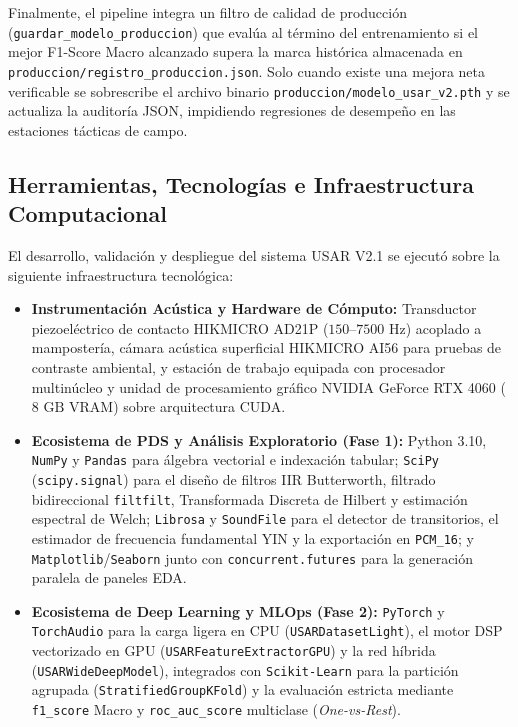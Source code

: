 \documentclass[11pt, a4paper]{article}
\begin{document}
Finalmente, el pipeline integra un filtro de calidad de producción (\texttt{guardar\_modelo\_produccion}) que evalúa al término del entrenamiento si el mejor F1-Score Macro alcanzado supera la marca histórica almacenada en \texttt{produccion/registro\_produccion.json}. Solo cuando existe una mejora neta verificable se sobrescribe el archivo binario \texttt{produccion/modelo\_usar\_v2.pth} y se actualiza la auditoría JSON, impidiendo regresiones de desempeño en las estaciones tácticas de campo.

\subsection{Herramientas, Tecnologías e Infraestructura Computacional}
El desarrollo, validación y despliegue del sistema USAR V2.1 se ejecutó sobre la siguiente infraestructura tecnológica:
\begin{itemize}
    \item \textbf{Instrumentación Acústica y Hardware de Cómputo:} Transductor piezoeléctrico de contacto HIKMICRO AD21P ($150\text{--}7500\text{ Hz}$) acoplado a mampostería, cámara acústica superficial HIKMICRO AI56 para pruebas de contraste ambiental, y estación de trabajo equipada con procesador multinúcleo y unidad de procesamiento gráfico NVIDIA GeForce RTX 4060 ($8\text{ GB}$ VRAM) sobre arquitectura CUDA.
    \item \textbf{Ecosistema de PDS y Análisis Exploratorio (Fase 1):} Python 3.10, \texttt{NumPy} y \texttt{Pandas} para álgebra vectorial e indexación tabular; \texttt{SciPy} (\texttt{scipy.signal}) para el diseño de filtros IIR Butterworth, filtrado bidireccional \texttt{filtfilt}, Transformada Discreta de Hilbert y estimación espectral de Welch; \texttt{Librosa} y \texttt{SoundFile} para el detector de transitorios, el estimador de frecuencia fundamental YIN y la exportación en \texttt{PCM\_16}; y \texttt{Matplotlib}/\texttt{Seaborn} junto con \texttt{concurrent.futures} para la generación paralela de paneles EDA.
    \item \textbf{Ecosistema de Deep Learning y MLOps (Fase 2):} \texttt{PyTorch} y \texttt{TorchAudio} para la carga ligera en CPU (\texttt{USARDatasetLight}), el motor DSP vectorizado en GPU (\texttt{USARFeatureExtractorGPU}) y la red híbrida (\texttt{USARWideDeepModel}), integrados con \texttt{Scikit-Learn} para la partición agrupada (\texttt{StratifiedGroupKFold}) y la evaluación estricta mediante \texttt{f1\_score} Macro y \texttt{roc\_auc\_score} multiclase (\textit{One-vs-Rest}).
\end{itemize}
\end{document}
